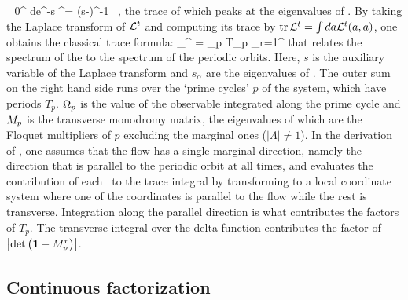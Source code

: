 \beq
	\int_0^{\infty} d\zeit e^{-s\zeit} \Lop^\zeit = (s-\Aop)^{-1} \, ,
	\label{eq-ResolventA}
\eeq
the trace of which peaks at the eigenvalues of \Aop. By taking the
Laplace transform of ${\cal L}^{t}$ and computing its trace
by $\mbox{\rm tr}\, {\cal L}^{t} = \int da {\cal L}^{t} (a,a)$, one obtains the
classical trace formula:
\beq
\sum_{}^{\infty}  = \sum_p T_p
\sum_{r=1}^{\infty} 
that relates the spectrum of the {\evOper} to the spectrum of the periodic
orbits. Here,  $s$ is the auxiliary
variable of the Laplace transform and $s_{\alpha}$ are the eigenvalues of \Aop . The
outer sum on the right hand side runs over the `prime cycles' $p$ of the system,
which have periods $T_p$. $\Omega_p$ is the value of
the observable integrated along the prime cycle and ${M}_p$ is the transverse
monodromy matrix, the eigenvalues of which are the Floquet multipliers of $p$
excluding the marginal ones ($|\Lambda| \neq 1$). In the derivation of
, one assumes that the flow has a single marginal direction,
namely the direction that is parallel to the periodic orbit at all times, and evaluates the
contribution of each \po\ to the trace integral by transforming to a local coordinate
system where one of the coordinates is
parallel to the flow while the rest is transverse. Integration along the
parallel direction is what contributes the factors of $T_p$. The transverse integral
over the delta function contributes the factor of $\left|\mbox{\rm det}\,\!\left({\bf 1}-{M}_p^{r}\right)\right|$.

\subsection{Continuous factorization}
\label{s-ContFac}

